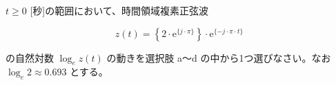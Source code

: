 $t \ge 0$ [秒]の範囲において、時間領域複素正弦波 

\[
z(t) =  \left \{ 2 \cdot \textrm{e}^{\{ j \cdot \pi \}} \right \} \cdot \textrm{e}^{\{ -j \cdot \pi \cdot t \}}
\]

\bigskip
\noindent の自然対数 $\log_e z(t)$ の動きを選択肢 a〜d の中から1つ選びなさい。なお $\log_e 2 \approx 0.693$ とする。
